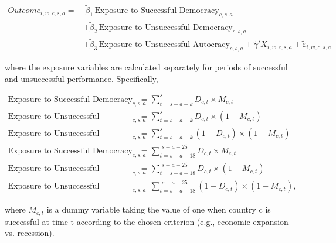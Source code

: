 \documentclass[11pt]{article}
\begin{document}
\begin{equation}
	\label{3}
	\begin{split}
		Outcome_{i,w,c,s,a} 
		= & \; \tilde{\beta}_{1} \, \text{Exposure to Successful Democracy}_{c,s,a} \\
		& + \tilde{\beta}_{2} \, \text{Exposure to Unsuccessful Democracy}_{c,s,a} \\
		& + \tilde{\beta}_{3} \, \text{Exposure to Unsuccessful Autocracy}_{c,s,a} 
		+ \tilde{\gamma}' X_{i,w,c,s,a} 
		+ \tilde{\varepsilon}_{i,w,c,s,a}
	\end{split}
\end{equation}

where the exposure variables are calculated separately for periods of successful and unsuccessful performance. Specifically,

\begin{equation}
	\label{4}
	\begin{aligned}
		\text{Exposure to Successful Democracy}_{c,s,a} 
		&= \sum_{t=s-a+k}^{s} D_{c,t} \times M_{c,t} \\[1em]
		\text{Exposure to Unsuccessful Democracy}_{c,s,a} 
		&= \sum_{t=s-a+k}^{s} D_{c,t} \times (1 - M_{c,t}) \\[1em]
		\text{Exposure to Unsuccessful Autocracy}_{c,s,a} 
		&= \sum_{t=s-a+k}^{s} (1 - D_{c,t}) \times (1 - M_{c,t}) \\[1em]
		\text{Exposure to Successful Democracy 18--25}_{c,s,a} 
		&= \sum_{t = s-a+18}^{\,\,s-a+25} D_{c,t} \times M_{c,t} \\[1em]
		\text{Exposure to Unsuccessful Democracy 18--25}_{c,s,a} 
		&= \sum_{t = s-a+18}^{\,\,s-a+25} D_{c,t} \times (1 - M_{c,t}) \\[1em]
		\text{Exposure to Unsuccessful Autocracy 18--25}_{c,s,a} 
		&= \sum_{t = s-a+18}^{\,\,s-a+25} (1 - D_{c,t}) \times (1 - M_{c,t}),
	\end{aligned}
\end{equation}

where $M_{c,t}$ is a dummy variable taking the value of one when country c is successful at time t according to the chosen criterion (e.g., economic expansion vs. recession).
\end{document}

